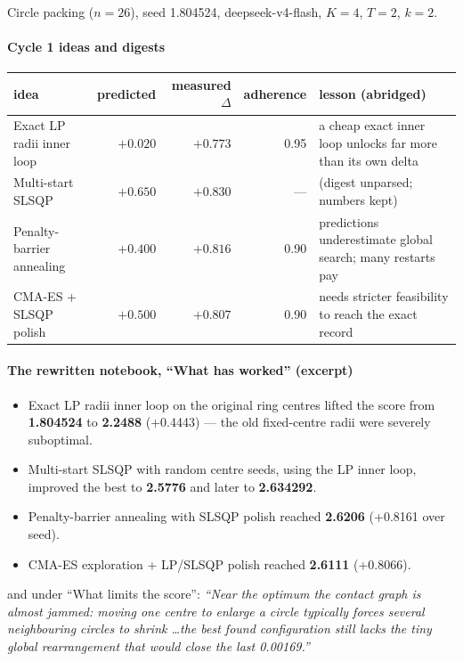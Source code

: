 \documentclass[11pt]{article}
\begin{document}
Circle packing ($n=26$), seed 1.804524, deepseek-v4-flash, $K=4$, $T=2$, $k=2$.

\paragraph{Cycle 1 ideas and digests}
\begin{center}\small
\begin{tabular}{@{}lrrr>{\raggedright\arraybackslash}p{58mm}@{}}
\toprule
idea & predicted & measured $\Delta$ & adherence & lesson (abridged) \\
\midrule
Exact LP radii inner loop & $+0.020$ & $+0.773$ & 0.95 & a cheap exact inner loop unlocks far
  more than its own delta \\
Multi-start SLSQP & $+0.650$ & $+0.830$ & --- & (digest unparsed; numbers kept) \\
Penalty-barrier annealing & $+0.400$ & $+0.816$ & 0.90 & predictions underestimate global
  search; many restarts pay \\
CMA-ES + SLSQP polish & $+0.500$ & $+0.807$ & 0.90 & needs stricter feasibility to reach
  the exact record \\
\bottomrule
\end{tabular}
\end{center}

\paragraph{The rewritten notebook, ``What has worked'' (excerpt)}
\begin{itemize}\itemsep1pt\small
  \item Exact LP radii inner loop on the original ring centres lifted the score from
    \textbf{1.804524} to \textbf{2.2488} (+0.4443) --- the old fixed-centre radii were severely
    suboptimal.
  \item Multi-start SLSQP with random centre seeds, using the LP inner loop, improved the best
    to \textbf{2.5776} and later to \textbf{2.634292}.
  \item Penalty-barrier annealing with SLSQP polish reached \textbf{2.6206} (+0.8161 over seed).
  \item CMA-ES exploration + LP/SLSQP polish reached \textbf{2.6111} (+0.8066).
\end{itemize}
and under ``What limits the score'': \emph{``Near the optimum the contact graph is almost
jammed: moving one centre to enlarge a circle typically forces several neighbouring circles to
shrink \ldots the best found configuration still lacks the tiny global rearrangement that would
close the last 0.00169.''}
\end{document}
